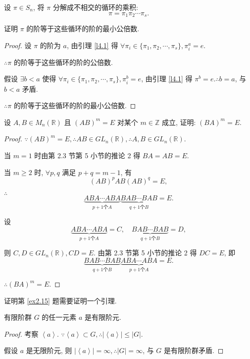 \documentclass[color=black,device=normal,lang=cn,mode=geye]{elegantnote}
\begin{document}
\begin{exercise}%
    设 $\pi\in S_n$, 将 $\pi$ 分解成不相交的循环的乘积:
    \[\pi=\pi_1\pi_2\cdots\pi_s.\]

    证明 $\pi$ 的阶等于这些循环的阶的最小公倍数.
\end{exercise}
\begin{proof}
    设 $\pi$ 的阶为 $a$, 由引理 \ref{l4.1} 得 $\forall\pi_i\in\{\pi_1,\pi_2,\cdots,\pi_s\},\pi_i^a=e$.

    $\therefore\pi$ 的阶等于这些循环的阶的公倍数.

    假设 $\exists b<a$ 使得 $\forall\pi_i\in\{\pi_1,\pi_2,\cdots,\pi_s\},\pi_i^b=e$, 由引理 \ref{l4.1} 得 $\pi^b=e.\therefore b=a$, 与 $b<a$ 矛盾.

    $\therefore\pi$ 的阶等于这些循环的阶的最小公倍数.
\end{proof}
\begin{exercise}%
    设 $A,B\in M_n(\mathbb{R})$ 且 $(AB)^m=E$ 对某个 $m\in\mathbb{Z}$ 成立, 证明: $(BA)^m=E$.
\end{exercise}
\begin{proof}
    $\because(AB)^m=E,\therefore AB\in GL _n(\mathbb{R}),\therefore A,B\in GL _n(\mathbb{R})$.

    当 $m=1$ 时由第 2.3 节第 5 小节的推论 2 得 $BA=AB=E$.

    当 $m\geq2$ 时, $\forall p,q$ 满足 $p+q=m-1$, 有
    \[(AB)^pAB(AB)^q=E,\]

    $\therefore$
    \[\underbrace{ABA\cdots ABA}_{p+1\text{个}A}\underbrace{BAB\cdots BAB}_{q+1\text{个}B}=E.\]

    设
    \[\underbrace{ABA\cdots ABA}_{p+1\text{个}A}=C,\quad\underbrace{BAB\cdots BAB}_{q+1\text{个}B}=D,\]

    则 $C,D\in GL _n(\mathbb{R}),CD=E$. 由第 2.3 节第 5 小节的推论 2 得 $DC=E$, 即
    \[\underbrace{BAB\cdots BAB}_{q+1\text{个}B}\underbrace{ABA\cdots ABA}_{p+1\text{个}A}=E.\]

    $\therefore(BA)^m=E$.
\end{proof}
证明第 \ref{ex2.15} 题需要证明一个引理.
\begin{lemma}\label{l4.2}
    有限阶群 $G$ 的任一元素 $a$ 是有限阶元.
\end{lemma}
\begin{proof}
    考察 $\left<a\right>$. $\because\left<a\right>\subset G,\therefore|\left<a\right>|\leq|G|$.

    假设 $a$ 是无限阶元, 则 $|\left<a\right>|=\infty,\therefore|G|=\infty$, 与 $G$ 是有限阶群矛盾.
\end{proof}
\end{document}
